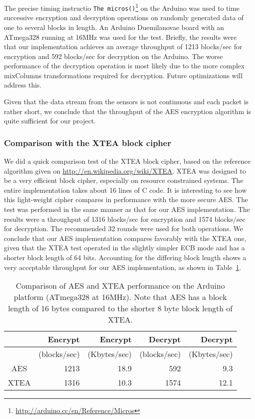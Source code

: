 The precise timing instructio \texttt{The micros()}\footnote{\url{http://arduino.cc/en/Reference/Micros}} on the Arduino was used to time successive encryption and decryption operations on randomly generated data of one to several blocks in length. An Arduino Duemilanovae board with an ATmega328 running at 16MHz was used for the test. Briefly, the results were that our implementation achieves an average throughput of 1213 blocks/sec for encryption and 592 blocks/sec for decryption on the Arduino. The worse performance of the decryption operation is most likely due to the more complex mixColumns transformations required for decryption. Future optimizations will address this.

Given that the data stream from the sensors is not continuous and each packet is rather short, we conclude that the throughput of the AES encryption algorithm is quite sufficient for our project.

\subsubsection*{Comparison with the XTEA block cipher}

We did a quick comparison test of the XTEA  block cipher, based on the reference algorithm given on \url{http://en.wikipedia.org/wiki/XTEA}. XTEA was designed to be a very efficient block cipher, especially on resource constrained systems. The entire implementation takes about 16 lines of C code. It is interesting to see how this light-weight cipher compares in performance with the more secure AES. The test was performed in the same manner as that for our AES implementation. The results were a throughput of 1316 blocks/sec for encryption and 1574 blocks/sec for decryption. The recommended 32 rounds were used for both operations. We conclude that our AES implementation compares favorably with the XTEA one, given that the XTEA test operated in the slightly simpler ECB mode and has a shorter block length of 64 bits. Accounting for the differing block length shows a very acceptable throughput for our AES implementation, as shown in Table~\ref{tab:aes-xtea-comparison}.

\begin{table}[h]
\begin{center}
\begin{tabular}{|c|r|r|r|r|}
\hline  & Encrypt & Encrypt & Decrypt & Decrypt \\
\hline  & (blocks/sec) & (Kbytes/sec) & (blocks/sec) & (Kbytes/sec) \\ 
\hline AES & 1213 & 18.9 & 592 & 9.3 \\ 
\hline XTEA & 1316 & 10.3 & 1574 & 12.1 \\ 
\hline 
\end{tabular}
\end{center}
\caption{Comparison of AES and XTEA performance on the Arduino platform (ATmega328 at 16MHz). Note that AES has a block length of 16 bytes compared to the shorter 8 byte block length of XTEA.}
\label{tab:aes-xtea-comparison}
\end{table} 

